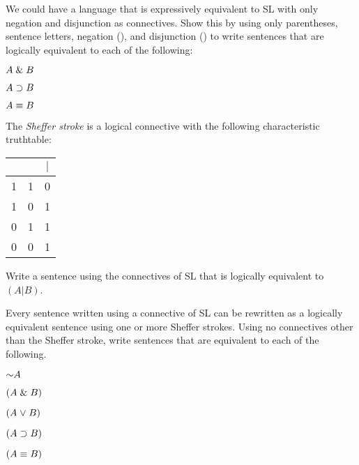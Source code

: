 We could have a language that is expressively equivalent to SL with only negation and disjunction as connectives.
Show this by using only parentheses, sentence letters, negation (\enot), and disjunction (\eor) to write sentences that are logically equivalent to each of the following:
\begin{earg}
\item $A \mathrel\& B$
\item $A \supset B$
\item $A \equiv B$
\end{earg}
The \emph{Sheffer stroke} is a logical connective with the following characteristic truthtable:
\begin{center}
\begin{tabular}{c|c|c}
\metaA{} & \metaB{} & \metaA{}$|$\metaB{}\\
\hline
1 & 1 & 0\\
1 & 0 & 1\\
0 & 1 & 1\\
0 & 0 & 1
\end{tabular}
\end{center}
\begin{earg}
\item Write a sentence using the connectives of SL that is logically equivalent to $(A|B)$.
\end{earg}
Every sentence written using a connective of SL can be rewritten as a logically equivalent sentence using one or more Sheffer strokes. Using no connectives other than the Sheffer stroke, write sentences that are equivalent to each of the following. 
\begin{earg}
\item $\enot A$
\item $(A\mathrel\& B)$
\item $(A\mkern1mu\vee\mkern1mu B)$
\item $(A\supset B)$
\item $(A\equiv B)$
\end{earg}


\problempart
\label{HW2.F}


